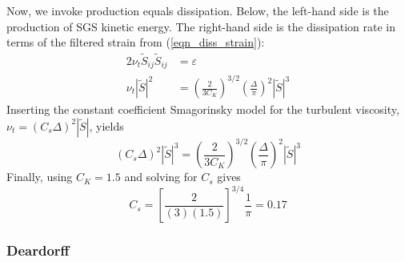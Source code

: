 Now, we invoke production equals dissipation.  Below, the left-hand side is the production of SGS kinetic energy.  The right-hand side is the dissipation rate in terms of the filtered strain from (\ref{eqn_diss_strain}):
\begin{align}
\label{eqn_prod_diss_2}
2 \nu_t \tilde{S}_{ij} \tilde{S}_{ij} &= \varepsilon \\
\nu_t |\tilde{S}|^2 &= \left(\frac{2}{3 C_K}\right)^{3/2} \left(\frac{\Delta}{\pi}\right)^2 |\tilde{S}|^3
\end{align}
Inserting the constant coefficient Smagorinsky model for the turbulent viscosity, $\nu_t = (C_s \Delta)^2 |\tilde{S}|$, yields
\begin{equation}
(C_s \Delta)^2 |\tilde{S}|^3 = \left(\frac{2}{3 C_K}\right)^{3/2} \left(\frac{\Delta}{\pi}\right)^2 |\tilde{S}|^3
\end{equation}
Finally, using $C_K = 1.5$ and solving for $C_s$ gives
\begin{equation}
\label{eqn_smag_const_lilly}
C_s = \left[ \frac{2}{(3)(1.5)} \right]^{3/4} \frac{1}{\pi} = 0.17
\end{equation}

\subsubsection*{Deardorff}

